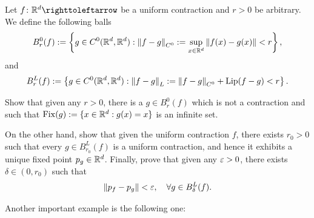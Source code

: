 \begin{exercise}
  Let $f\colon\R^{d}\carr$ be a uniform contraction and $r>0$ be arbitrary. We define the following balls
  \begin{displaymath}
    B_{r}^{0}(f):=\left\{g\in C^{0}(\mathbb{R}^{d},\mathbb{R}^{d}) : \left\|{f-g}\right\|_{C^{0}}:=\sup_{x\in\mathbb{R}^{d}}\left\|{f(x)-g(x)}\right\|<r\right\},
  \end{displaymath}
  and
  \begin{displaymath}
    B_{r}^{L}(f):=\left\{g\in C^{0}(\mathbb{R}^{d},\mathbb{R}^{d}) : \left\|{f-g}\right\|_{L}:=\left\|{f-g}\right\|_{C^{0}} + \operatorname{Lip}(f-g)<r\right\}.
  \end{displaymath}

  Show that given any $r>0$, there is a $g\in B_{r}^{0}(f)$ which is not a contraction and such that $\operatorname{Fix}(g):=\{x\in\mathbb{R}^{d} : g(x)=x\}$ is an infinite set.

  On the other hand, show that given the uniform contraction $f$, there exists $r_{0}>0$ such that every $g\in B_{r_{0}}^{L}(f)$ is a uniform contraction, and hence it exhibits a unique fixed point $p_{g}\in\mathbb{R}^{d}$. Finally, prove that given any $\varepsilon>0$, there exists $\delta\in(0,r_{0})$ such that
  \begin{displaymath}
    \left\|{p_{f}-p_{g}}\right\|<\varepsilon, \quad\forall g\in B_{\delta}^{L}(f).
  \end{displaymath}
\end{exercise}

Another important example is the following one:

